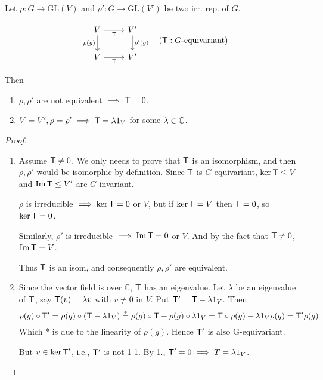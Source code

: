 \begin{lemma}
  Let $\rho: G \to \text{GL}(V)$ and $\rho': G\to \text{GL}(V')$ be two irr.
  rep. of $G$.

  \[
    \begin{tikzcd}
      V \arrow[d, "\rho(g)"'] \arrow[r, "{\sf T}"'] & V' \arrow[d, "\rho'(g)"] \\
      V \arrow[r, "{\sf T}"'] & V'
    \end{tikzcd}
    \quad ({\sf T}: G\text{-equivariant})
  \]

  Then
  \begin{enumerate}
    \item $\rho, \rho'$ are not equivalent $\implies$ ${\sf T} = 0$.
    \item $V = V', \rho = \rho' \implies {\sf T} = \lambda 1_V$ for some
      $\lambda \in \mathbb{C}$.
  \end{enumerate}

  \begin{proof} \mbox{}
    \begin{enumerate}
      \item Assume ${\sf T} \ne 0$. We only needs to prove that ${\sf T}$ is an isomorphism,
        and then $\rho, \rho'$ would be isomorphic by definition.
        Since ${\sf T}$ is $G$-equivariant,
        $\ker {\sf T} \le V$ and $\operatorname{Im} {\sf T}\le V'$ are $G$-invariant.

        $\rho$ is irreducible $\implies \ker {\sf T} = 0$ or $V$, but
        if $\ker {\sf T} = V$ then ${\sf T} = 0$, so $\ker {\sf T} = 0$.

        Similarly, $\rho'$ is irreducible $\implies \operatorname{Im} {\sf T} = 0$ or $V$.
        And by the fact that ${\sf T} \neq 0$, $\operatorname{Im} {\sf T} = V$.

        Thus ${\sf T}$ is an isom, and consequently $\rho, \rho'$ are equivalent.

      \item  Since the vector field is over $\mathbb{C}$, ${\sf T}$ has
        an eigenvalue. Let $\lambda$ be an eigenvalue of ${\sf T}$, say
        ${\sf T}(v) = \lambda v$ with $v \ne 0$ in $V$.
        Put ${\sf T}' = {\sf T} - \lambda 1_V$. Then
        \[ \rho(g) \circ {\sf T}' = \rho(g) \circ ({\sf T} - \lambda 1_V) \stackrel{*}{=}
          \rho(g) \circ {\sf T} - \rho(g) \circ \lambda 1_V =
          {\sf T} \circ \rho(g) - \lambda 1_V \rho(g) = {\sf T}' \rho(g) \]
        Which * is due to the linearity of $\rho(g)$. Hence ${\sf T}'$ is
        also G-equivariant.

        But $v \in \ker {\sf T}'$, i.e., ${\sf T}'$ is not 1-1. By 1., ${\sf T'} = 0 \implies
        T = \lambda 1_V$.
    \end{enumerate}
  \end{proof}
\end{lemma}

